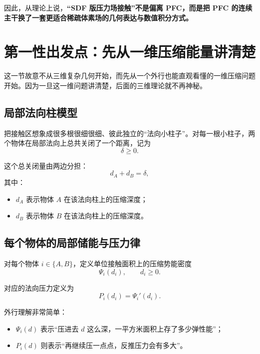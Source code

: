 \documentclass[12pt,a4paper]{ctexart}
\begin{document}
因此，从理论上说，\textbf{“SDF 版压力场接触”不是偏离 PFC，而是把 PFC 的连续主干换了一套更适合稀疏体素场的几何表达与数值积分方式。}

\section{第一性出发点：先从一维压缩能量讲清楚}

这一节故意不从三维复杂几何开始，而先从一个外行也能直观看懂的一维压缩问题开始。因为一旦这一维问题讲清楚，后面的三维理论就不再神秘。

\subsection{局部法向柱模型}
把接触区想象成很多根很细很细、彼此独立的“法向小柱子”。对每一根小柱子，两个物体在局部法向上总共关闭了一个距离，记为
\begin{equation}
    \delta \ge 0.
\end{equation}

这个总关闭量由两边分担：
\begin{equation}
    d_A + d_B = \delta,
\end{equation}
其中：
\begin{itemize}
    \item $d_A$ 表示物体 $A$ 在该法向柱上的压缩深度；
    \item $d_B$ 表示物体 $B$ 在该法向柱上的压缩深度。
\end{itemize}

\subsection{每个物体的局部储能与压力律}
对每个物体 $i\in\{A,B\}$，定义单位接触面积上的压缩势能密度
\begin{equation}
    \Psi_i(d_i), \qquad d_i\ge 0.
\end{equation}

对应的法向压力定义为
\begin{equation}
    P_i(d_i)=\Psi_i'(d_i).
\end{equation}

外行理解非常简单：
\begin{itemize}
    \item $\Psi_i(d)$ 表示“压进去 $d$ 这么深，一平方米面积上存了多少弹性能”；
    \item $P_i(d)$ 则表示“再继续压一点点，反推压力会有多大”。
\end{itemize}
\end{document}
